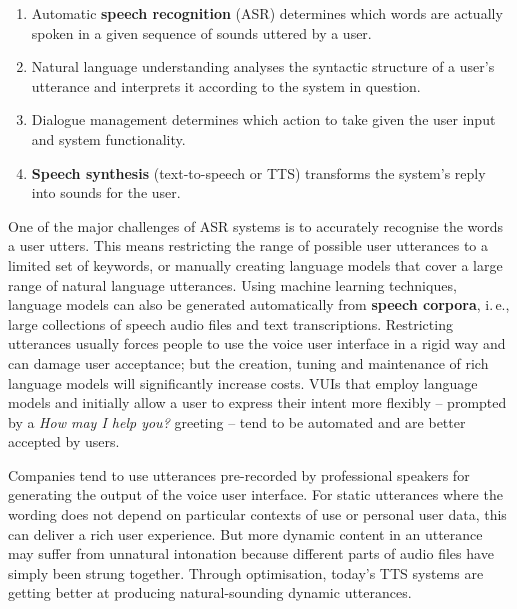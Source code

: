 \begin{multicols}{2}
\begin{enumerate}
\item Automatic \textbf{speech recognition} (ASR) determines which words are actually spoken in a given sequence of sounds uttered by a user.  
\item Natural language understanding analyses the syntactic structure of a user’s utterance and interprets it according to the system in question.
\item Dialogue management determines which action to take given the user input and system functionality.   
\item \textbf{Speech synthesis} (text-to-speech or TTS) transforms the system’s reply into sounds for the user.
\end{enumerate}

One of the major challenges of ASR systems is to accurately recognise the words a user utters. This means restricting the range of possible user utterances to a limited set of keywords, or manually creating language models that cover a large range of natural language utterances. Using machine learning techniques, language models can also be generated automatically from \textbf{speech corpora}, i.\,e., large collections of speech audio files and text transcriptions. Restricting utterances usually forces people to use the voice user interface in a rigid way and can damage user acceptance; but the creation, tuning and maintenance of rich language models will significantly increase costs. VUIs that employ language models and initially allow a user to express their intent more flexibly -- prompted by a \textit{How may I help you?} greeting -- tend to be automated and are better accepted by users.


Companies tend to use utterances pre-recorded by professional speakers for generating the output of the voice user interface. For static utterances where the wording does not depend on particular contexts of use or personal user data, this can deliver a rich user experience. But more dynamic content in an utterance may suffer from unnatural intonation because different parts of audio files have simply been strung together. Through optimisation, today’s TTS systems are getting better at producing natural-sounding dynamic utterances.


\end{multicols}
